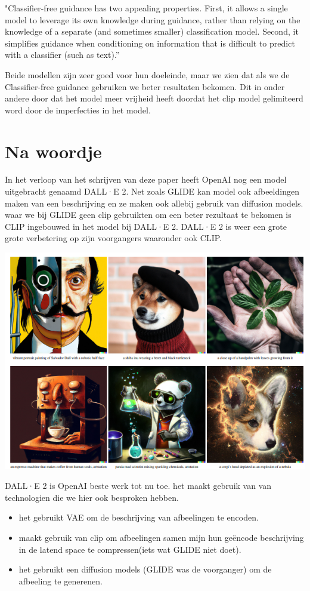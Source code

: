 \documentclass[12pt]{article}
\begin{document}
\bigskip
"Classifier-free guidance has two appealing properties. First, it allows a single model to leverage its own
knowledge during guidance, rather than relying on the knowledge of a separate (and sometimes smaller)
classification model. Second, it simplifies guidance when conditioning on information that is difficult to
predict with a classifier (such as text).”
\textcite{Nichol2021}



\bigskip
Beide modellen zijn zeer goed voor hun doeleinde, maar we zien dat als we de Classifier-free guidance gebruiken we
beter resultaten bekomen. Dit in onder andere door dat het model meer vrijheid heeft doordat het clip model
gelimiteerd word door de imperfecties in het model.



\section{Na woordje}
In het verloop van het schrijven van deze paper heeft OpenAI nog een model uitgebracht genaamd DALL·E 2.
Net zoals GLIDE kan model ook afbeeldingen maken van een beschrijving en ze maken ook allebij gebruik van diffusion models.
waar we bij GLIDE geen clip gebruikten om een beter rezultaat te bekomen is CLIP ingebouwed in het model bij DALL·E 2.
DALL·E 2 is weer een grote grote verbetering op zijn voorgangers waaronder ook CLIP.

\begin{center}
    \includegraphics[width=1\columnwidth]{dall-e-2.png}
\end{center}

\bigskip
DALL·E 2 is OpenAI beste werk tot nu toe. het maakt gebruik van van technologien die we hier ook besproken hebben.

\begin{itemize}
    \item het gebruikt VAE om de beschrijving van afbeelingen te encoden.
    \item maakt gebruik van clip om afbeelingen samen mijn hun geëncode beschrijving in de latend space te compressen(iets wat GLIDE niet doet).
    \item het gebruikt een diffusion models (GLIDE was de voorganger) om de afbeeling te generenen.
\end{itemize}

\bigskip
\printbibliography
\end{document}

